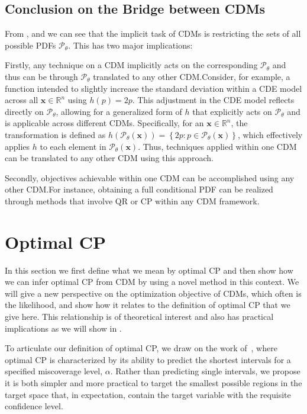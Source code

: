 \subsection{Conclusion on the Bridge between CDMs}

From ,  and  we can see that the implicit task of CDMs is restricting the sets of all possible PDFs $\mathscr{P}_\theta$. This has two major implications:

Firstly, any technique on a CDM implicitly acts on the corresponding $\mathscr{P}_\theta$ and thus can be through $\mathscr{P}_\theta$ translated to any other CDM.\@ Consider, for example, a function intended to slightly increase the standard deviation within a CDE model across all $\mathbf{x} \in \mathbb{R}^n$ using $h(p) = 2p$. This adjustment in the CDE model reflects directly on $\mathscr{P}_\theta$, allowing for a generalized form of $h$ that explicitly acts on $\mathscr{P}_\theta$ and is applicable across different CDMs. Specifically, for an $\mathbf{x} \in \mathbb{R}^n$, the transformation is defined as $h(\mathscr{P}_{\theta}(\mathbf{x})) = \left\{2 p: p \in \mathscr{P}_\theta(\mathbf{x}) \right\}$, which effectively applies $h$ to each element in $\mathscr{P}_\theta(\mathbf{x})$. Thus, techniques applied within one CDM can be translated to any other CDM using this approach.

Secondly, objectives achievable within one CDM can be accomplished using any other CDM.\@ For instance, obtaining a full conditional PDF can be realized through methods that involve QR or CP within any CDM framework.

\section{Optimal CP}\label{sec:optimal_cp}

In this section we first define what we mean by optimal CP and then show how we can infer optimal CP from CDM by using a novel method in this context. We will give a new perspective on the optimization objective of CDMs, which often is the likelihood, and show how it relates to the definition of optimal CP that we give here. This relationship is of theoretical interest and also has practical implications as we will show in .

To articulate our definition of optimal CP, we draw on the work of~\cite{sesia2021conformal}, where optimal CP is characterized by its ability to predict the shortest intervals for a specified miscoverage level, $\alpha$. Rather than predicting single intervals, we propose it is both simpler and more practical to target the smallest possible regions in the target space that, in expectation, contain the target variable with the requisite confidence level.

